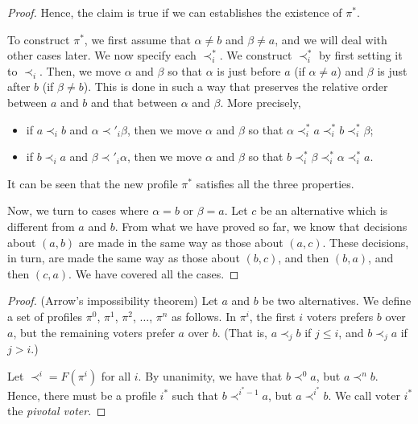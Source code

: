 \documentclass[10pt]{article}
\begin{document}
\begin{itemize}
\begin{proof}
				Hence, the claim is true if we can establishes the existence of $\pi^*.$
				
				To construct $\pi^*$, we first assume that $\alpha \neq b$ and $\beta \neq a$, and we will deal with
				other cases later. We now specify each $\prec^*_i$. We construct $\prec^*_i$ by first setting it to $\prec_i$.
				Then, we move $\alpha$ and $\beta$ so that $\alpha$ is just before $a$ (if $\alpha \neq a$) and 
				$\beta$ is just after $b$ (if $\beta \neq b$). This is done in such a way that preserves the relative
				order between $a$ and $b$ and that between $\alpha$ and $\beta$. More precisely,
				
				\begin{itemize}
					\item if $a \prec_i b$ and $\alpha \prec'_i \beta$, then we move $\alpha$ and $\beta$ so that
						$\alpha \prec^*_i a \prec^*_i b \prec^*_i \beta$;
					\item if $b \prec_i a$ and $\beta \prec'_i \alpha$, then we move $\alpha$ and $\beta$ so that
						$b \prec^*_i \beta \prec^*_i \alpha \prec^*_i a$.
				\end{itemize}
				
				It can be seen that the new profile $\pi^*$ satisfies all the three properties.
				
				Now, we turn to cases where $\alpha = b$ or $\beta = a$. Let $c$ be an alternative
				which is different from $a$ and $b$. From what we have proved so far, we know that decisions 
				about $(a,b)$ are made in the same way as those about $(a,c)$. These
				decisions, in turn, are made the same way as those about $(b,c)$,
				and then $(b,a)$, and then $(c,a)$. We have covered all the cases.
			\end{proof}
			
			\begin{proof} (Arrow's impossibility theorem)
				Let $a$ and $b$ be two alternatives. We define a set of profiles
				$\pi^0$, $\pi^1$, $\pi^2$, $\dotsc$, $\pi^n$ as follows.
				In $\pi^i$, the first $i$ voters prefers $b$ over $a$, but
				the remaining voters prefer $a$ over $b.$ (That is, $a \prec_j b$
				if $j \leq i$, and $b \prec_j a$ if $j > i$.)
				
				Let $\prec^i = F(\pi^i)$ for all $i$. By unanimity, we have
				that $b \prec^0 a$, but $a \prec^n b$. Hence, there must be
				a profile $i^*$ such that $b \prec^{i^*-1} a$, but $a \prec^{i^*} b$.
				We call voter $i^*$ the \emph{pivotal voter}.
				

\end{proof}
\end{itemize}
\end{document}
